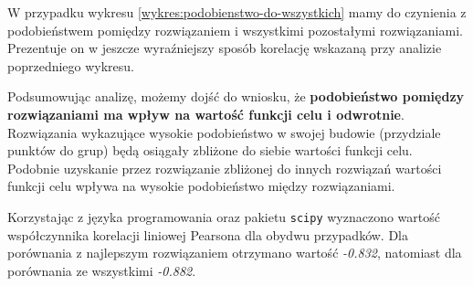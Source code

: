 \documentclass[main.tex]{subfiles}
\begin{document}
W przypadku wykresu \ref{wykres:podobienstwo-do-wszystkich} mamy do czynienia z podobieństwem pomiędzy rozwiązaniem i wszystkimi pozostałymi rozwiązaniami. Prezentuje on w jeszcze wyraźniejszy sposób korelację wskazaną przy analizie poprzedniego wykresu.

Podsumowując analizę, możemy dojść do wniosku, że \textbf{podobieństwo pomiędzy rozwiązaniami ma wpływ na wartość funkcji celu i odwrotnie}. Rozwiązania wykazujące wysokie podobieństwo w swojej budowie (przydziale punktów do grup) będą osiągały zbliżone do siebie wartości funkcji celu. Podobnie uzyskanie przez rozwiązanie zbliżonej do innych rozwiązań wartości funkcji celu wpływa na wysokie podobieństwo między rozwiązaniami.

Korzystając z języka programowania  oraz pakietu \texttt{scipy} wyznaczono wartość współczynnika korelacji liniowej Pearsona dla obydwu przypadków. Dla porównania z najlepszym rozwiązaniem otrzymano wartość \textit{-0.832}, natomiast dla porównania ze wszystkimi \textit{-0.882}.
\end{document}
